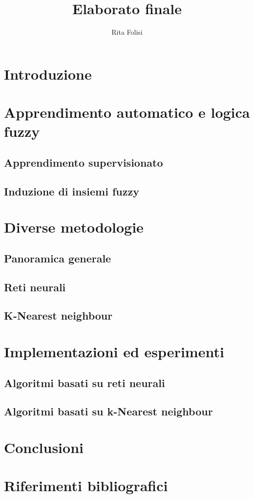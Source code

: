 \documentclass[11pt]{article}
\title{Elaborato finale}
\date{}
\author{Rita Folisi}
\begin{document}
	\maketitle
	\tableofcontents

	\newpage

	\section{Introduzione}
	\section{Apprendimento automatico e logica fuzzy}
	\subsection{Apprendimento supervisionato}
	\subsection{Induzione di insiemi fuzzy}
	\section{Diverse metodologie}
	\subsection{Panoramica generale}
	\subsection{Reti neurali}
	\subsection{K-Nearest neighbour}	

	\section{Implementazioni ed esperimenti}
	\subsection{Algoritmi basati su reti neurali}
	\subsection{Algoritmi basati su k-Nearest neighbour}
	\section{Conclusioni}
	\section{Riferimenti bibliografici}
\end{document}
